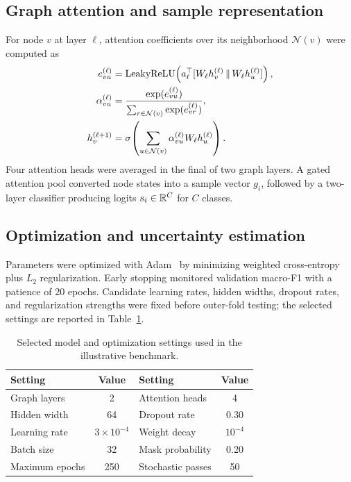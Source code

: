 \subsection{Graph attention and sample representation}

For node $v$ at layer $\ell$, attention coefficients over its neighborhood
$\mathcal{N}(v)$ were computed as
\begin{align}
e_{vu}^{(\ell)} &={\rm LeakyReLU}\!\left(
a_\ell^\top[W_\ell h_v^{(\ell)}\,\Vert\,W_\ell h_u^{(\ell)}]\right),\\
\alpha_{vu}^{(\ell)} &=
\frac{\exp(e_{vu}^{(\ell)})}
{\sum_{r\in\mathcal{N}(v)}\exp(e_{vr}^{(\ell)})},\\
h_v^{(\ell+1)} &= \sigma\!\left(
\sum_{u\in\mathcal{N}(v)}\alpha_{vu}^{(\ell)}W_\ell h_u^{(\ell)}\right).
\label{eq:gat}
\end{align}
Four attention heads were averaged in the final of two graph layers. A gated
attention pool converted node states into a sample vector $g_i$, followed by a
two-layer classifier producing logits $s_i\in\mathbb{R}^C$ for $C$ classes.

\subsection{Optimization and uncertainty estimation}

Parameters were optimized with Adam~\cite{kingma2015adam} by minimizing weighted
cross-entropy plus $L_2$ regularization. Early stopping monitored validation
macro-F1 with a patience of 20 epochs. Candidate learning rates, hidden widths,
dropout rates, and regularization strengths were fixed before outer-fold testing;
the selected settings are reported in Table~\ref{tab:hyperparameters}.

\begin{table}[tbp]
\centering
\caption{Selected model and optimization settings used in the illustrative
benchmark.}
\label{tab:hyperparameters}
\begin{tabularx}{0.86\textwidth}{>{\raggedright\arraybackslash}X c
  >{\raggedright\arraybackslash}X c}
\toprule
Setting & Value & Setting & Value \\
\midrule
Graph layers & 2 & Attention heads & 4 \\
Hidden width & 64 & Dropout rate & 0.30 \\
Learning rate & $3\times10^{-4}$ & Weight decay & $10^{-4}$ \\
Batch size & 32 & Mask probability & 0.20 \\
Maximum epochs & 250 & Stochastic passes & 50 \\
\bottomrule
\end{tabularx}
\end{table}

